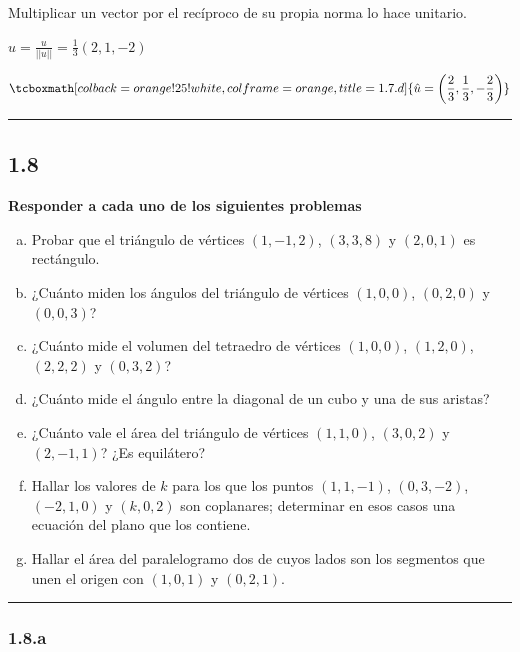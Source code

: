 \documentclass{article}
\begin{document}
Multiplicar un vector por el recíproco de su propia norma lo hace unitario.

$\hat{u} = \frac{u}{||u||} = \frac{1}{3} (2, 1, -2)$
 
\begin{equation}
\tcboxmath[colback=orange!25!white,colframe=orange,title=1.7.d]
{ \hat{u} = \left( \frac{2}{3}, \frac{1}{3}, -\frac{2}{3} \right) }
\end{equation}

\hrule
\vspace{10 pt}

\subsection*{1.8}
\label{subsec:1.8}

\textbf{Responder a cada uno de los siguientes problemas}

\begin{enumerate}[(a)]
\bfseries
\item Probar que el triángulo de vértices $(1, -1, 2)$, $(3, 3, 8)$ y $(2, 0, 1)$ es rectángulo.

\item ¿Cuánto miden los ángulos del triángulo de vértices $(1, 0, 0)$, $(0, 2, 0)$ y $(0, 0, 3)$?

\item ¿Cuánto mide el volumen del tetraedro de vértices $(1, 0, 0)$, $(1, 2, 0)$, $(2, 2, 2)$ y $(0, 3, 2)$?

\item ¿Cuánto mide el ángulo entre la diagonal de un cubo y una de sus aristas?

\item ¿Cuánto vale el área del triángulo de vértices $(1, 1, 0)$, $(3, 0, 2)$ y $(2, -1, 1)$? ¿Es equilátero?

\item Hallar los valores de $k$ para los que los puntos $(1, 1, -1)$, $(0, 3, -2)$, $(-2, 1, 0)$ y $(k, 0, 2)$ son coplanares; determinar en esos casos una ecuación del plano que los contiene.

\item Hallar el área del paralelogramo dos de cuyos lados son los segmentos que unen el origen con $(1, 0, 1)$ y $(0, 2, 1)$.
\end{enumerate}
\hrule

\subsubsection*{1.8.a}
\label{subsubsec:1.8.a}
\end{document}
